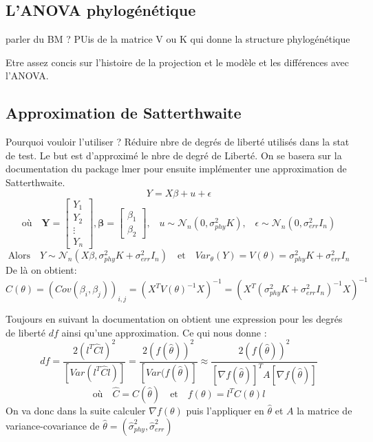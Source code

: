 \documentclass[a4paper, 12pt]{article}\usepackage[]{graphicx}\usepackage[]{xcolor}
\begin{document}


\subsection{L'ANOVA phylogénétique}

parler du BM ? 
PUis de la matrice V ou K qui donne la structure phylogénétique 

Etre assez concis sur l'histoire de la projection et le modèle et les différences avec l'ANOVA. 


\subsection{Approximation de Satterthwaite}

Pourquoi vouloir l'utiliser ? Réduire nbre de degrés de liberté utilisés dans la stat de test. 
Le but est d'approximé le nbre de degré de Liberté. 
On se basera sur la documentation du package lmer \cite{kuznetsovaLmerTestPackageTests2017} pour ensuite implémenter une approximation de Satterthwaite. 
\begin{equation}
    Y = X\beta + u + \epsilon 
\end{equation} 
\[
\text{où} \quad \mathbf{Y} = \begin{bmatrix} Y_1 \\ Y_2 \\ \vdots \\ Y_n \end{bmatrix}, \mathbf{\beta} = \begin{bmatrix} \beta_1 \\ \beta_2  \end{bmatrix}\text{,} \quad u \sim \mathcal{N}_n(0, \sigma^2_{phy}K) \text{,} \quad \epsilon \sim \mathcal{N}_n(0, \sigma^2_{err}I_n)
\]
\newline
\[
 \text{Alors} \quad Y \sim \mathcal{N}_n(X\beta, \sigma^2_{phy}K + \sigma^2_{err}I_n) \quad \text{et} \quad Var_\theta(Y) = V(\theta) = \sigma^2_{phy}K + \sigma^2_{err}I_n
\]
De là on obtient:
\begin{equation}
    C(\theta) = (Cov(\beta_i , \beta_j))_{i,j} = (X^TV(\theta)^{-1}X)^{-1} = (X^T(\sigma^2_{phy}K + \sigma^2_{err}I_n)^{-1}X)^{-1}
\end{equation}

Toujours en suivant la documentation \cite{kuznetsovaLmerTestPackageTests2017} on obtient une expression pour les degrés de liberté $df$ ainsi qu'une approximation. Ce qui nous donne :
\begin{equation}
    df = \frac{2(l^T\hat{C}l)^2}{[Var(l^T\hat{C}l)]}=\frac{2(f(\hat{\theta}))^2}{[Var(f(\hat{\theta})]}\approx \frac{2(f(\hat{\theta}))^2}{[\nabla f(\hat{\theta})]^T A[\nabla f(\hat{\theta})]}
\end{equation} 
\[\text{où} \quad \hat{C} = C(\hat\theta) \quad \text{et} \quad f(\theta) = l^TC(\theta)l\]
On va donc dans la suite calculer $\nabla f(\theta)$ puis l'appliquer en $\hat{\theta}$ et $A$ la matrice de variance-covariance de $\hat{\theta}=(\hat{\sigma}^2_{phy}, \hat{\sigma}^2_{err})$ 
\end{document}
